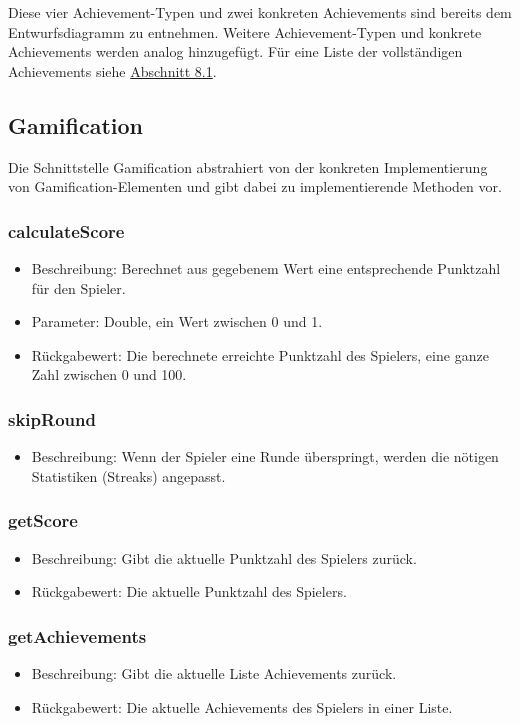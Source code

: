 \documentclass[a4paper]{scrreprt}
\begin{document}
	\vspace{8pt}
	Diese vier Achievement-Typen und zwei konkreten Achievements sind bereits dem Entwurfsdiagramm zu entnehmen. Weitere Achievement-Typen und konkrete Achievements werden analog hinzugefügt. Für eine Liste der vollständigen Achievements siehe \hyperlink{Ach}{Abschnitt 8.1}. \\
	\vspace{8pt}


	\subsection{Gamification}
	Die Schnittstelle Gamification abstrahiert von der konkreten Implementierung von Gamification-Elementen und gibt dabei zu implementierende Methoden vor. \\

	\subsubsection{calculateScore}
	\begin{itemize}
		\item Beschreibung: Berechnet aus gegebenem Wert eine entsprechende Punktzahl für den Spieler.
		\item Parameter: Double, ein Wert zwischen 0 und 1.
		\item Rückgabewert: Die berechnete erreichte Punktzahl des Spielers, eine ganze Zahl zwischen 0 und 100.
	\end{itemize}
	\subsubsection{skipRound}
	\begin{itemize}
		\item Beschreibung: Wenn der Spieler eine Runde überspringt, werden die nötigen Statistiken (Streaks) angepasst.
	\end{itemize}
	\subsubsection{getScore}
	\begin{itemize}
		\item Beschreibung: Gibt die aktuelle Punktzahl des Spielers zurück.
		\item Rückgabewert: Die aktuelle Punktzahl des Spielers.
	\end{itemize}
	\subsubsection{getAchievements}
	\begin{itemize}
		\item Beschreibung: Gibt die aktuelle Liste Achievements zurück.
		\item Rückgabewert: Die aktuelle Achievements des Spielers in einer Liste.
	\end{itemize}
\end{document}
